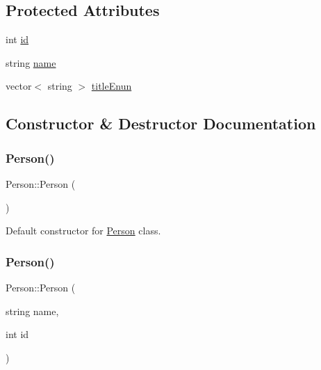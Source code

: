 \subsection*{Protected Attributes}
\begin{DoxyCompactItemize}
\item 
int \hyperlink{class_person_aec48a92f614a854ff380a15eb8e2f479}{id}
\item 
string \hyperlink{class_person_a669b64897b4d823a27bb5866368d4dfa}{name}
\item 
vector$<$ string $>$ \hyperlink{class_person_a162c1e6b3ce254b6bbffc0e947943031}{title\+Enun}
\end{DoxyCompactItemize}


\subsection{Constructor \& Destructor Documentation}
\mbox{\label{class_person_a0397c6f89fafc12e738923f612bc41a3}} 
\subsubsection{\texorpdfstring{Person()}{Person()}\hspace{0.1cm}{\footnotesize\ttfamily [1/2]}}
{\footnotesize\ttfamily Person\+::\+Person (\begin{DoxyParamCaption}{ }\end{DoxyParamCaption})}



Default constructor for \hyperlink{class_person}{Person} class. 

\mbox{\label{class_person_a89a3ed74790668699f46f5cfbcd16bd0}} 
\subsubsection{\texorpdfstring{Person()}{Person()}\hspace{0.1cm}{\footnotesize\ttfamily [2/2]}}
{\footnotesize\ttfamily Person\+::\+Person (\begin{DoxyParamCaption}\item[{string}]{name,  }\item[{int}]{id }\end{DoxyParamCaption})}



